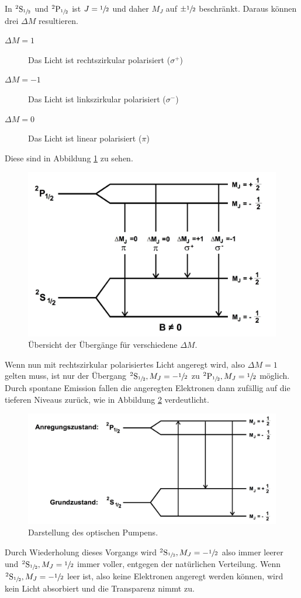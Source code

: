 In ${}^2\text{S}_{\sfrac{1}{2}}$ und ${}^2\text{P}_{\sfrac{1}{2}}$ ist $J={\sfrac{1}{2}}$ und daher $M_J$ auf $\pm \sfrac{1}{2}$ beschränkt. Daraus können drei $\Delta M$ resultieren.
\begin{description}
	\item[$\Delta M=1$] Das Licht ist rechtszirkular polarisiert ($\sigma^{+}$)
	\item[$\Delta M=-1$] Das Licht ist linkszirkular polarisiert ($\sigma^{-}$)
	\item[$\Delta M=0$] Das Licht ist linear polarisiert ($\pi$)
\end{description}
Diese sind in Abbildung \ref{fig:ubergang} zu sehen.
\begin{figure}
	\centering
	\includegraphics[width=0.8\linewidth]{img/ubergange.jpg}
	\caption{Übersicht der Übergänge für verschiedene $\Delta M$.}
	\label{fig:ubergang}
\end{figure}
Wenn nun mit rechtszirkular polarisiertes Licht angeregt wird, also $\Delta M=1$ gelten muss, ist nur der Übergang ${}^2\text{S}_{\sfrac{1}{2}}, M_J=-\sfrac{1}{2}$ zu ${}^2\text{P}_{\sfrac{1}{2}}, M_J=\sfrac{1}{2}$ möglich. Durch spontane Emission fallen die angeregten Elektronen dann zufällig auf die tieferen Niveaus zurück, wie in Abbildung \ref{fig:optPumpen} verdeutlicht.
\begin{figure}
	\centering
	\includegraphics[width=0.8\linewidth]{img/optPumpen.jpg}
	\caption{Darstellung des optischen Pumpens.\cite{V21}}
	\label{fig:optPumpen}
\end{figure}
Durch Wiederholung dieses Vorgangs wird ${}^2\text{S}_{\sfrac{1}{2}}, M_J=-\sfrac{1}{2}$ also immer leerer und ${}^2\text{S}_{\sfrac{1}{2}},M_J=\sfrac{1}{2}$ immer voller, entgegen der natürlichen Verteilung. Wenn  ${}^2\text{S}_{\sfrac{1}{2}}, M_J=-\sfrac{1}{2}$ leer ist, also keine Elektronen angeregt werden können, wird kein Licht absorbiert und die Transparenz nimmt zu.
